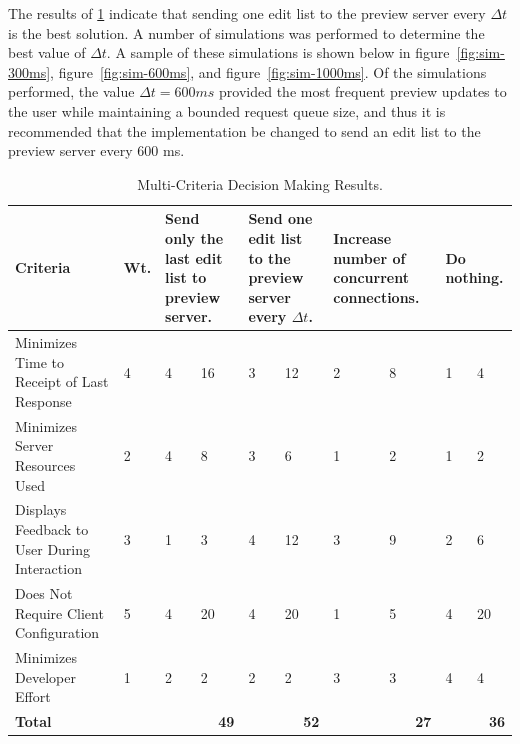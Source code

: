 \documentclass[se,resubmit]{uw-wkrpt}
\begin{document}
The results of \ref{tbl:mcdm} indicate that sending one edit list to the
preview server every $\Delta t$ is the best solution. A number of
simulations was performed to determine the best value of $\Delta t$. A
sample of these simulations is shown below in figure~\ref{fig:sim-300ms},
figure~\ref{fig:sim-600ms}, and figure~\ref{fig:sim-1000ms}. Of the
simulations performed, the value $\Delta t=600 ms$ provided the most
frequent preview updates to the user while maintaining a bounded request
queue size, and thus it is recommended that the implementation be changed
to send an edit list to the preview server every 600 ms.

\begin{table}
  \caption{Multi-Criteria Decision Making Results.}
  \label{tbl:mcdm}
  \centering
  \begin{tabular}{|p{2.0cm}|p{1.0cm}|p{1.25cm}|p{1.25cm}|p{1.25cm}|p{1.25cm}|
                                     p{1.25cm}|p{1.25cm}|p{1.25cm}|p{1.25cm}|}
    \hline
    \textbf{Criteria} &
    \textbf{Wt.} &
    \multicolumn{2}{|p{2.5cm}|}{\textbf{Send only the last edit list to preview
    server.}} &
    \multicolumn{2}{|p{2.5cm}|}{\textbf{Send one edit list to the preview
    server every $\Delta t$.}} &
    \multicolumn{2}{|p{2.5cm}|}{\textbf{Increase number of concurrent
    connections.}} &
    \multicolumn{2}{|p{2.5cm}|}{\textbf{Do nothing.}} \\
    \hline\hline
    Minimizes Time to Receipt of Last Response &
       4 &  4 & 16 &  3 & 12 &  2 &  8 &  1 &  4 \\
    \hline
    Minimizes Server Resources Used &
       2 &  4 &  8 &  3 &  6 &  1 &  2 &  1 &  2 \\
    \hline
    Displays Feedback to User During Interaction &
       3 &  1 &  3 &  4 & 12 &  3 &  9 &  2 &  6 \\
    \hline
    Does Not Require Client Configuration &
       5 &  4 & 20 &  4 & 20 &  1 &  5 &  4 & 20 \\
    \hline
    Minimizes Developer Effort &
       1 &  2 &  2 &  2 &  2 &  3 &  3 &  4 &  4 \\
    \hline
    \hline
    \textbf{Total} &
      &
      \multicolumn{2}{|r|}{\textbf{49}} &
      \multicolumn{2}{|r|}{\textbf{52}} &
      \multicolumn{2}{|r|}{\textbf{27}} &
      \multicolumn{2}{|r|}{\textbf{36}} \\
    \hline
  \end{tabular}
\end{table}
\end{document}
